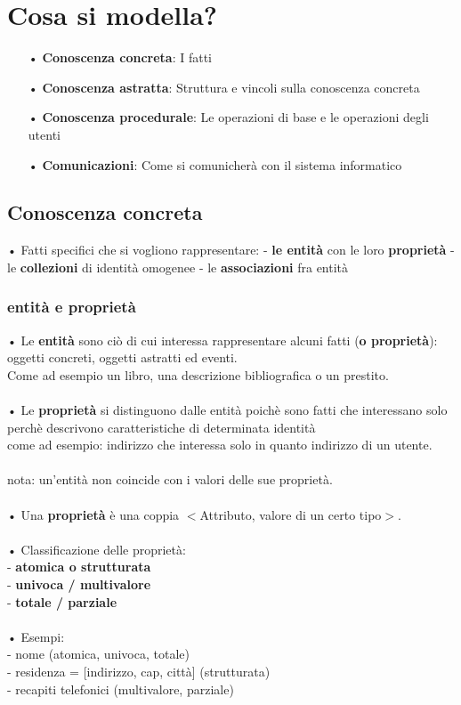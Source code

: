 \documentclass[12pt, letterpaper]{article}
\begin{document}
\section{Cosa si modella?}

\begin{itemize}
   \item[•] \textbf{Conoscenza concreta}: I fatti
   \item[•] \textbf{Conoscenza astratta}: Struttura e vincoli sulla conoscenza concreta 
   \item[•] \textbf{Conoscenza procedurale}: Le operazioni di base e le operazioni degli utenti
   \item[•] \textbf{Comunicazioni}: Come si comunicherà con il sistema informatico 
\end{itemize}

\subsection{Conoscenza concreta}

• Fatti specifici che si vogliono rappresentare:
- \textbf{le entità} con le loro \textbf{proprietà}
- le \textbf{collezioni} di identità omogenee
- le \textbf{associazioni} fra entità

\subsubsection{entità e proprietà}

• Le \textbf{entità} sono ciò di cui interessa rappresentare alcuni fatti (\textbf{o proprietà}):\\
oggetti concreti, oggetti astratti ed eventi.
\\
Come ad esempio un libro, una descrizione bibliografica o un prestito.
\\
\\
• Le \textbf{proprietà} si distinguono dalle entità poichè sono fatti che interessano solo perchè descrivono caratteristiche di determinata identità
\\
come ad esempio: indirizzo che interessa solo in quanto indirizzo di un utente.
\\
\\
nota: un'entità non coincide con i valori delle sue proprietà.
\\
\\
• Una \textbf{proprietà} è una coppia $<$Attributo, valore di un certo tipo$>$.
\\
\\
• Classificazione delle proprietà:\\
- \textbf{atomica o strutturata}\\
- \textbf{univoca / multivalore}\\
- \textbf{totale / parziale}
\\
\\
• Esempi:\\
- nome (atomica, univoca, totale)\\
- residenza = [indirizzo, cap, città] (strutturata)\\
- recapiti telefonici (multivalore, parziale)
\end{document}
